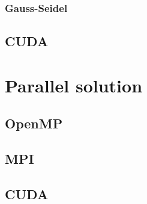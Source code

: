 \documentclass[a4paper, 10pt]{article}
\begin{document}
\subsubsection{Gauss-Seidel}

\subsection{CUDA}

\section{Parallel solution}

\subsection{OpenMP}

\subsection{MPI}

\subsection{CUDA}
\end{document}
